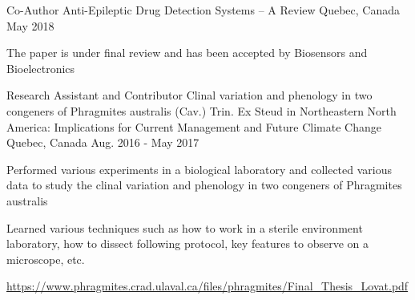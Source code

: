 \begin{cventries}
  \cventry
    {Co-Author}
    {Anti-Epileptic Drug Detection Systems – A Review}
    {Quebec, Canada}
    {May 2018}
    {
      \begin{cvitems}
        \item {The paper is under final review and has been accepted by Biosensors and Bioelectronics}
      \end{cvitems}
    }
        \cventry
    {Research Assistant
and Contributor}
    {Clinal variation and phenology in two congeners of Phragmites australis (Cav.) Trin. Ex Steud in Northeastern North America: Implications for Current Management and Future Climate Change}
    {Quebec, Canada}
    {Aug. 2016 - May 2017}
    {
      \begin{cvitems}
        \item {Performed various experiments in a biological laboratory and collected various data to study the clinal variation and phenology in two congeners of Phragmites australis}
        \item {Learned various techniques such as how to work in a sterile environment laboratory, how to dissect following protocol, key features to observe on a microscope, etc. }
        \item{\url{https://www.phragmites.crad.ulaval.ca/files/phragmites/Final_Thesis_Lovat.pdf}}
      \end{cvitems}
    }
 
\end{cventries}

